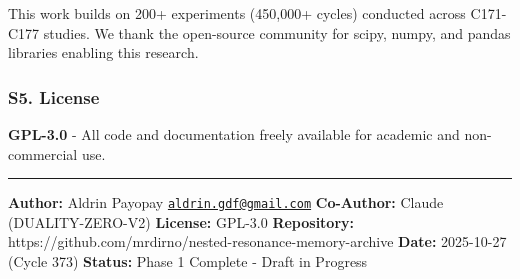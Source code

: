 \documentclass[
]{article}
\begin{document}
This work builds on 200+ experiments (450,000+ cycles) conducted across
C171-C177 studies. We thank the open-source community for scipy, numpy,
and pandas libraries enabling this research.

\subsubsection{S5. License}\label{s5.-license}

\textbf{GPL-3.0} - All code and documentation freely available for
academic and non-commercial use.

\begin{center}\rule{0.5\linewidth}{0.5pt}\end{center}

\textbf{Author:} Aldrin Payopay
\href{mailto:aldrin.gdf@gmail.com}{\nolinkurl{aldrin.gdf@gmail.com}}
\textbf{Co-Author:} Claude (DUALITY-ZERO-V2) \textbf{License:} GPL-3.0
\textbf{Repository:}
https://github.com/mrdirno/nested-resonance-memory-archive
\textbf{Date:} 2025-10-27 (Cycle 373) \textbf{Status:} Phase 1 Complete
- Draft in Progress
\end{document}

